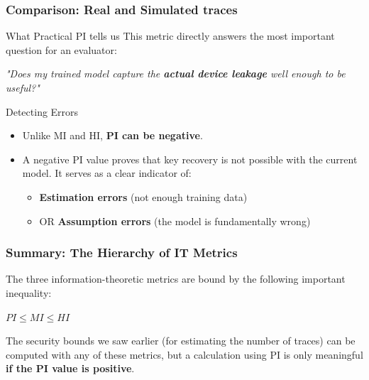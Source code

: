 \begin{frame}
    \frametitle{Comparison: Real and Simulated traces}
    
    \begin{block}{What Practical PI tells us}
        This metric directly answers the most important question for an evaluator:
        \vspace{0.3cm}
        
        \centering
        \textit{"Does my trained model capture the \textbf{actual device leakage} well enough to be useful?"}
    \end{block}
    
    \begin{block}{Detecting Errors}
        \begin{itemize}
            \item Unlike MI and HI, \textbf{PI can be negative}.
            \item A negative PI value proves that key recovery is not possible with the current model. It serves as a clear indicator of:
                \begin{itemize}
                    \item \textbf{Estimation errors} (not enough training data)
                    \item OR \textbf{Assumption errors} (the model is fundamentally wrong)
                \end{itemize}
        \end{itemize}
    \end{block}
\end{frame}

\begin{frame}
    \frametitle{Summary: The Hierarchy of IT Metrics}
    
        The three information-theoretic metrics are bound by the following important inequality:
        
        \vspace{1cm}
        \begin{itemize}
            
        \centering
        \huge
        $ PI \le MI \le HI $
        
        \end{itemize}{}
        \vspace{1cm}
    
    \begin{alertblock}{}
        The security bounds we saw earlier (for estimating the number of traces) can be computed with any of these metrics, but a calculation using PI is only meaningful \textbf{if the PI value is positive}.
    \end{alertblock}
\end{frame}

